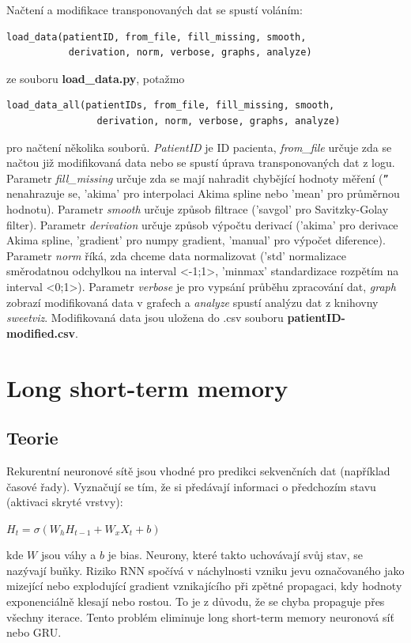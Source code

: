 Načtení a modifikace transponovaných dat se spustí voláním:
\begin{verbatim}
load_data(patientID, from_file, fill_missing, smooth,
           derivation, norm, verbose, graphs, analyze)
\end{verbatim}
ze souboru \textbf{load\_data.py}, potažmo
\begin{verbatim}
load_data_all(patientIDs, from_file, fill_missing, smooth,
                derivation, norm, verbose, graphs, analyze)
\end{verbatim}
pro načtení několika souborů. \textit{PatientID} je ID pacienta, \textit{from\_file} určuje zda se načtou již modifikovaná data nebo se spustí úprava transponovaných dat z logu. Parametr \textit{fill\_missing} určuje zda se mají nahradit chybějící hodnoty měření (\texttt{''} nenahrazuje se, 'akima' pro interpolaci Akima spline nebo 'mean' pro průměrnou hodnotu). Parametr \textit{smooth} určuje způsob filtrace ('savgol' pro Savitzky-Golay filter). Parametr \textit{derivation} určuje způsob výpočtu derivací ('akima' pro derivace Akima spline, 'gradient' pro numpy gradient, 'manual' pro výpočet diference). Parametr \textit{norm} říká, zda chceme data normalizovat ('std' normalizace směrodatnou odchylkou na interval <-1;1>, 'minmax' standardizace rozpětím na interval <0;1>). Parametr \textit{verbose} je pro vypsání průběhu zpracování dat, \textit{graph} zobrazí modifikovaná data v grafech a \textit{analyze} spustí analýzu dat z knihovny \textit{sweetviz}. Modifikovaná data jsou uložena do .csv souboru \textbf{patientID-modified.csv}.


\section{Long short-term memory}
\label{ch:lstm}

\subsection{Teorie}

Rekurentní neuronové sítě jsou vhodné pro predikci sekvenčních dat (například časové řady). Vyznačují se tím, že si předávají informaci o předchozím stavu (aktivaci skryté vrstvy):

$H_{t}=\sigma (W_{h}H_{t-1}+W_{x}X_{t}+b)$

\noindent kde $W$ jsou váhy a $b$ je bias. Neurony, které takto uchovávají svůj stav, se nazývají buňky. Riziko RNN spočívá v náchylnosti vzniku jevu označovaného jako mizející nebo explodující gradient vznikajícího při zpětné propagaci, kdy hodnoty exponenciálně klesají nebo rostou. To je z důvodu, že se chyba propaguje přes všechny iterace. Tento problém eliminuje long short-term memory neuronová síť nebo GRU.


